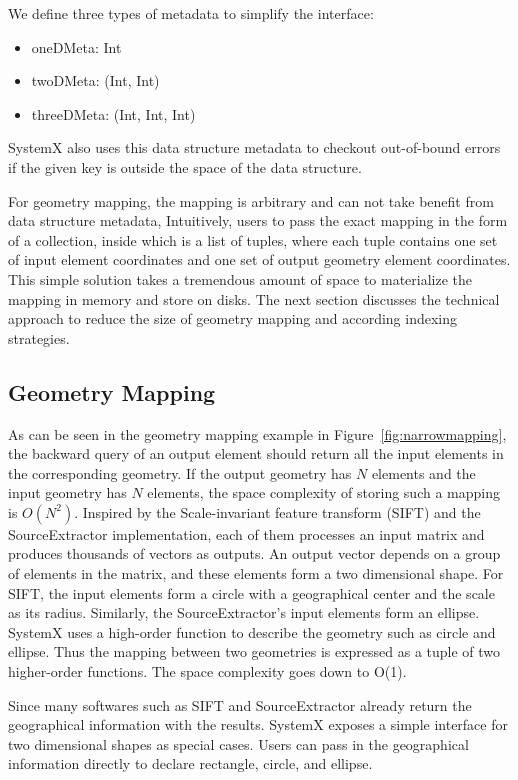 \documentclass{sig-alternate}
\newenvironment{shortlist}{
        \vspace*{-0.5em}
  \begin{itemize}
  \setlength{\itemsep}{-0.1em}
}{
  \end{itemize}
        \vspace*{-0.5em}
}
\begin{document}
We define three types of metadata to simplify the interface:
\begin{shortlist}
\item{} oneDMeta: Int
\item{} twoDMeta: (Int, Int)
\item{} threeDMeta: (Int, Int, Int)
\end{shortlist}  
SystemX also uses this data structure metadata to checkout out-of-bound errors if the given key is outside the space of the data structure.

For geometry mapping, the mapping is arbitrary and can not take benefit from data structure metadata, 
Intuitively, users to pass the exact mapping in the form of a collection, inside which is a list of tuples, where each tuple 
contains one set of input element coordinates and one set of output geometry element coordinates. 
This simple solution takes a tremendous amount of space to materialize the mapping in memory and store on disks.
The next section discusses the technical approach to reduce the size of geometry mapping and according indexing strategies.


\subsection{Geometry Mapping}
\label{sec:Design-GeometryMapping}
As can be seen in the geometry mapping example in Figure~\ref{fig:narrowmapping}, the backward query of an output element should return all the input elements in the corresponding geometry. If the output geometry has $N$ elements and the input geometry has $N$ elements, the space complexity of storing such a mapping is $O(N^2)$. 
Inspired by the Scale-invariant feature transform (SIFT) and the SourceExtractor implementation, each of them processes an input matrix and produces thousands of vectors as outputs. An output vector depends on a group of elements in the matrix, and these elements form a two dimensional shape. 
For SIFT, the input elements form a circle with a geographical center and the scale as its radius.
Similarly, the SourceExtractor's input elements form an ellipse. 
SystemX uses a high-order function to describe the geometry such as circle and ellipse. 
Thus the mapping between two geometries is expressed as a tuple of two higher-order functions.
The space complexity goes down to O(1).

Since many softwares such as SIFT and SourceExtractor already return the geographical information with the results.
SystemX exposes a simple interface for two dimensional shapes as special cases.
Users can pass in the geographical information directly to declare rectangle, circle, and ellipse.
\end{document}
